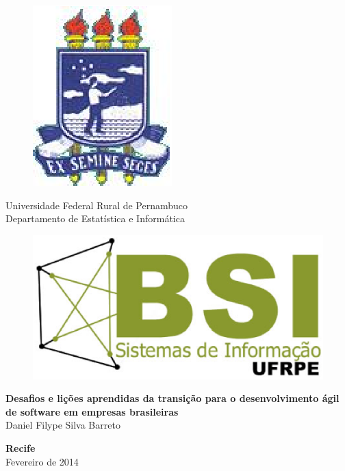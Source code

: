 \begin{figure}[h]
\leavevmode
\begin{minipage}{\textwidth}
\includegraphics[scale=0.7]
{prefacios/capa/logo-ufrpe.eps}
\end{minipage}
\end{figure}
\vspace{-3.5cm}
{\bf
\begin{center}
{\Large
\hspace*{0cm}Universidade Federal Rural de Pernambuco \\
\hspace*{0cm}Departamento de Estatística e Informática}\\
\end{center}
}
\noindent
\begin{figure}[h]
\centering
\includegraphics[scale=0.5]{prefacios/capa/logo-bsi-presencial-v3-amp.eps}
\end{figure}


\vspace{2.5cm}
\noindent
\begin{center}
{\Large \bf Desafios e lições aprendidas da transição para o desenvolvimento ágil de software em empresas brasileiras} \\[5cm]
{\Large Daniel Filype Silva Barreto}\\[6mm]
\end{center}


\vspace{1.5cm}
\begin{center}
{\large {\bf Recife}\\[6mm]
Fevereiro de 2014}
\end{center}
\newpage
